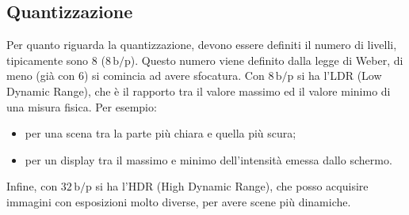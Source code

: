 \subsection{Quantizzazione}
Per quanto riguarda la quantizzazione, devono essere definiti il numero di livelli, tipicamente sono $8$ ($8 \, \text{b/p}$). Questo numero viene definito dalla
legge di Weber, di meno (già con $6$) si comincia ad avere sfocatura. Con $8 \, \text{b/p}$ si ha l'LDR (Low Dynamic Range), che è il rapporto tra il valore
massimo ed il valore minimo di una misura fisica. Per esempio:
\begin{itemize}
        \item per una scena tra la parte più chiara e quella più scura;
        \item per un display tra il massimo e minimo dell'intensità emessa dallo schermo.
\end{itemize}
Infine, con $32 \, \text{b/p}$ si ha l'HDR (High Dynamic Range), che posso acquisire immagini con esposizioni molto diverse, per avere scene più dinamiche.
\vfill